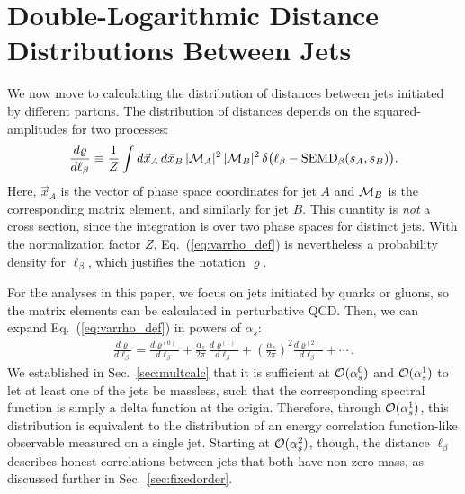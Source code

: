 \documentclass[letterpaper,11pt]{article}
\DeclareRobustCommand{\Sec}[1]{Sec.~\ref{#1}}
\DeclareRobustCommand{\Eq}[1]{Eq.~(\ref{#1})}
\begin{document}
\section{Double-Logarithmic Distance Distributions Between Jets}
\label{sec:dlogsec}


We now move to calculating the distribution of distances between jets initiated by different partons.
%
The distribution of distances depends on the squared-amplitudes for two processes:
%
\begin{align}
\label{eq:varrho_def}
\frac{d\varrho}{d \ell_\beta}\equiv \frac{1}{Z} \int d\vec x_A\, d\vec x_B\, |{\cal M}_A|^2\,|{\cal M}_B|^2\,\delta\big(
\ell_\beta - \text{SEMD}_\beta(s_A, s_B)
\big).
\end{align}
%
Here, $\vec x_A$ is the vector of phase space coordinates for jet $A$ and ${\cal M}_B$ is the corresponding matrix element, and similarly for jet $B$.  
%
This quantity is \emph{not} a cross section, since the integration is over two phase spaces for distinct jets.
%
With the normalization factor $Z$, \Eq{eq:varrho_def} is nevertheless a probability density for $\ell_\beta$, which justifies the notation $\varrho$.  


For the analyses in this paper, we focus on jets initiated by quarks or gluons, so the matrix elements can be calculated in perturbative QCD.  
%
Then, we can expand \Eq{eq:varrho_def} in powers of $\alpha_s$:
%
\begin{align}
\frac{d\varrho}{d\ell_\beta} = \frac{d\varrho^{(0)}}{d\ell_\beta}+\frac{\alpha_s}{2\pi}\,\frac{d\varrho^{(1)}}{d\ell_\beta}+\left(\frac{\alpha_s}{2\pi}\right)^2\frac{d\varrho^{(2)}}{d\ell_\beta}+\cdots\,.
\end{align}
%
We established in \Sec{sec:multcalc} that it is sufficient at ${\cal O}(\alpha_s^0)$ and ${\cal O}(\alpha_s^1)$ to let at least one of the jets be massless, such that the corresponding spectral function is simply a delta function at the origin.
%
Therefore, through ${\cal O}(\alpha_s^1)$, this distribution is equivalent to the distribution of an energy correlation function-like observable \cite{Banfi:2004yd,Larkoski:2013eya} measured on a single jet.  
%
Starting at ${\cal O}(\alpha_s^2)$, though, the distance $\ell_\beta$ describes honest correlations between jets that both have non-zero mass, as discussed further in \Sec{sec:fixedorder}.
\end{document}
